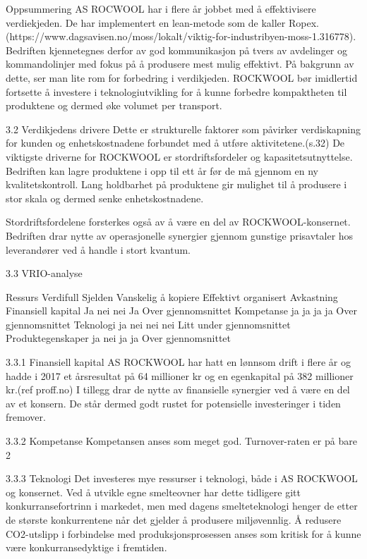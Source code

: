 Oppsummering
AS ROCWOOL har i flere år jobbet med å effektivisere verdiekjeden. De har implementert en lean-metode som de kaller Ropex. (https://www.dagsavisen.no/moss/lokalt/viktig-for-industribyen-moss-1.316778).
Bedriften kjennetegnes derfor av god kommunikasjon på tvers av avdelinger og kommandolinjer med fokus på å produsere mest mulig effektivt. På bakgrunn av dette, ser man lite rom for forbedring i verdikjeden. ROCKWOOL bør imidlertid fortsette å investere i teknologiutvikling for å kunne forbedre kompaktheten til produktene og dermed øke volumet per transport.

3.2 Verdikjedens drivere
Dette er strukturelle faktorer som påvirker verdiskapning for kunden og enhetskostnadene forbundet med å utføre aktivitetene.(s.32) De viktigste driverne for ROCKWOOL er stordriftsfordeler og kapasitetsutnyttelse. Bedriften kan lagre produktene i opp til ett år før de må gjennom en ny kvalitetskontroll. Lang holdbarhet på produktene gir mulighet til å produsere i stor skala og dermed senke enhetskostnadene.

Stordriftsfordelene forsterkes også av å være en del av ROCKWOOL-konsernet. Bedriften drar nytte av operasjonelle synergier gjennom gunstige prisavtaler hos leverandører ved å handle i stort kvantum.

3.3 VRIO-analyse

Ressurs
Verdifull
Sjelden
Vanskelig å kopiere
Effektivt organisert
Avkastning
Finansiell kapital
Ja
nei
nei
Ja
Over gjennomsnittet
Kompetanse
ja
ja
ja
ja
Over gjennomsnittet
Teknologi
ja
nei
nei
nei
Litt under gjennomsnittet
Produktegenskaper
ja
nei
ja
ja
Over gjennomsnittet

3.3.1 Finansiell kapital
AS ROCKWOOL har hatt en lønnsom drift i flere år og hadde i 2017 et årsresultat på 64 millioner kr og en egenkapital på 382 millioner kr.(ref proff.no) I tillegg drar de nytte av finansielle synergier ved å være en del av et konsern. De står dermed godt rustet for potensielle investeringer i tiden fremover.

3.3.2 Kompetanse
Kompetansen anses som meget god. Turnover-raten er på bare 2%

3.3.3 Teknologi
Det investeres mye ressurser i teknologi, både i AS ROCKWOOL og konsernet. Ved å utvikle egne smelteovner har dette tidligere gitt konkurransefortrinn i markedet, men med dagens smelteteknologi henger de etter de største konkurrentene når det gjelder å produsere miljøvennlig. Å redusere CO2-utslipp i forbindelse med produksjonsprosessen anses som kritisk for å kunne være konkurransedyktige i fremtiden.

